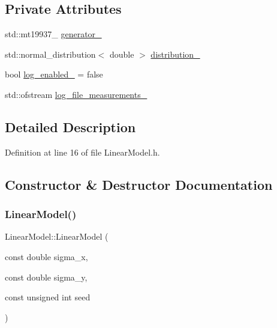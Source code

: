 \subsection*{Private Attributes}
\begin{DoxyCompactItemize}
\item 
std\+::mt19937\+\_ \mbox{\hyperlink{classbfl_1_1LinearModel_a6d2f72dd7215d227656292f00d060cfc}{generator\+\_\+}}
\item 
std\+::normal\+\_\+distribution$<$ double $>$ \mbox{\hyperlink{classbfl_1_1LinearModel_a3a12555172d2f2fa284ec47bb4799559}{distribution\+\_\+}}
\item 
bool \mbox{\hyperlink{classbfl_1_1LinearModel_ab87c7890e641ceff52efaacb186e5e1a}{log\+\_\+enabled\+\_\+}} = false
\item 
std\+::ofstream \mbox{\hyperlink{classbfl_1_1LinearModel_a4f5e200090a0bb1d58d90ff9417a467a}{log\+\_\+file\+\_\+measurements\+\_\+}}
\end{DoxyCompactItemize}


\subsection{Detailed Description}


Definition at line 16 of file Linear\+Model.\+h.



\subsection{Constructor \& Destructor Documentation}
\mbox{\label{classbfl_1_1LinearModel_ab10327a762b75b43d765d1b41c99dc51}} 
\subsubsection{\texorpdfstring{Linear\+Model()}{LinearModel()}\hspace{0.1cm}{\footnotesize\ttfamily [1/5]}}
{\footnotesize\ttfamily Linear\+Model\+::\+Linear\+Model (\begin{DoxyParamCaption}\item[{const double}]{sigma\+\_\+x,  }\item[{const double}]{sigma\+\_\+y,  }\item[{const unsigned int}]{seed }\end{DoxyParamCaption})\hspace{0.3cm}{\ttfamily [noexcept]}}



